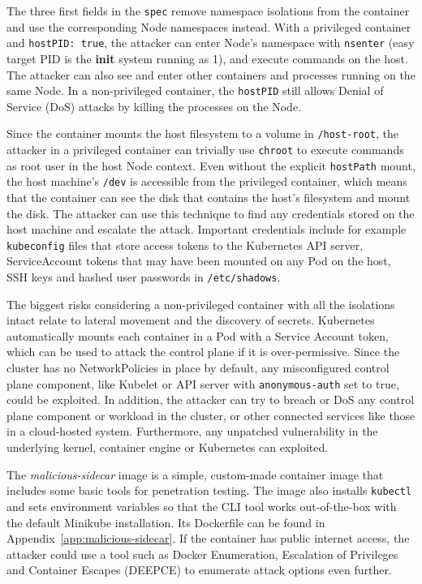 \documentclass[english, 12pt, a4paper, sci, utf8, a-2b, online]{aaltothesis}
\begin{document}


The three first fields in the \lstinline{spec} remove namespace isolations from the container and use the corresponding Node namespaces instead.
With a privileged container and \lstinline{hostPID: true}, the attacker can enter Node's namespace with \lstinline{nsenter} (easy target PID is the \textbf{init} system running as 1), and execute commands on the host.
The attacker can also see and enter other containers and processes running on the same Node.
In a non-privileged container, the \lstinline{hostPID} still allows Denial of Service (DoS) attacks by killing the processes on the Node.

Since the container mounts the host filesystem to a volume in \lstinline{/host-root}, the attacker in a privileged container can trivially use \lstinline{chroot} to execute commands as root user in the host Node context.
Even without the explicit \lstinline{hostPath} mount, the host machine's \lstinline{/dev} is accessible from the privileged container, which means that the container can see the disk that contains the host's filesystem and mount the disk.
The attacker can use this technique to find any credentials stored on the host machine and escalate the attack.
Important credentials include for example \lstinline{kubeconfig} files that store access tokens to the Kubernetes API server, ServiceAccount tokens that may have been mounted on any Pod on the host, SSH keys and hashed user passwords in \lstinline{/etc/shadows}.

The biggest risks considering a non-privileged container with all the isolations intact relate to lateral movement and the discovery of secrets.
Kubernetes automatically mounts each container in a Pod with a Service Account token, which can be used to attack the control plane if it is over-permissive.
Since the cluster has no NetworkPolicies in place by default, any misconfigured control plane component, like Kubelet or API server with \lstinline{anonymous-auth} set to true, could be exploited.
In addition, the attacker can try to breach or DoS any control plane component or workload in the cluster, or other connected services like those in a cloud-hosted system.
Furthermore, any unpatched vulnerability in the underlying kernel, container engine or Kubernetes can exploited.

The \emph{malicious-sidecar} image is a simple, custom-made container image that includes some basic tools for penetration testing.
The image also installs \lstinline{kubectl} and sets environment variables so that the CLI tool works out-of-the-box with the default Minikube installation.
Its Dockerfile can be found in Appendix~\ref{app:malicious-sidecar}.
If the container has public internet access, the attacker could use a tool such as Docker Enumeration, Escalation of Privileges and Container Escapes (DEEPCE) \cite{deepce} to enumerate attack options even further.
\end{document}
